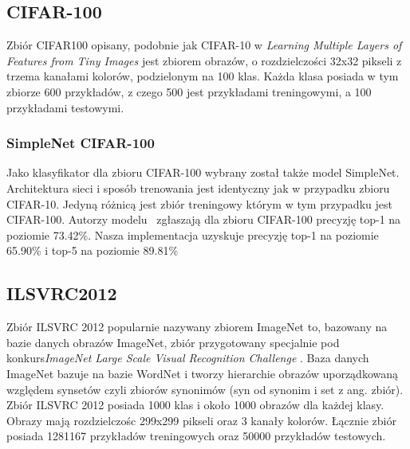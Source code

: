 \documentclass[
    left=2.5cm,         %
    right=2.5cm,        %
    top=2.5cm,          %
    bottom=3cm,         %
    bindingoffset=6mm,  %
    nohyphenation=false %
]{eiti/eiti-thesis}
\begin{document}
    \subsection{CIFAR-100}
    Zbiór CIFAR100 opisany, podobnie jak CIFAR-10 w  \textit{Learning Multiple Layers of Features from Tiny Images} \cite{Krizhevsky2009LearningML}
    jest zbiorem obrazów, o rozdzielczości 32x32 pikseli z trzema kanałami kolorów, podzielonym na 100 klas.
    Każda klasa posiada w tym zbiorze 600 przykładów, z czego 500 jest przykładami treningowymi, a 100 przykładami testowymi.
        \subsubsection{SimpleNet CIFAR-100}\label{SimpleNetCIFAR-100}
        Jako klasyfikator dla zbioru CIFAR-100 wybrany został także model SimpleNet. Architektura sieci i sposób trenowania
        jest identyczny jak w przypadku zbioru CIFAR-10. Jedyną różnicą jest zbiór treningowy którym w tym przypadku jest CIFAR-100.
        Autorzy modelu~\cite{DBLP:journals/corr/HasanPourRVS16} zgłaszają dla zbioru CIFAR-100 precyzję top-1 na poziomie 73.42\%.
        Nasza implementacja uzyskuje precyzję top-1 na poziomie 65.90\% i top-5 na poziomie 89.81\%


    \subsection{ILSVRC2012}\label{ILSVRC2012}
        Zbiór ILSVRC 2012 popularnie nazywany zbiorem ImageNet to, bazowany na bazie danych obrazów ImageNet, zbiór
        przygotowany specjalnie pod konkurs\textit{ImageNet Large Scale Visual Recognition Challenge} \cite{ILSVRC15}.
        Baza danych ImageNet bazuje na bazie WordNet i tworzy hierarchie obrazów uporządkowaną względem synsetów
        czyli zbiorów synonimów (syn od synonim i set z ang. zbiór). Zbiór ILSVRC 2012 posiada 1000 klas i około 1000
        obrazów dla każdej klasy. Obrazy mają rozdzielczośc 299x299 pikseli oraz 3 kanały kolorów. Łącznie zbiór posiada
        1281167 przykładów treningowych oraz 50000 przykładów testowych.
\end{document}
